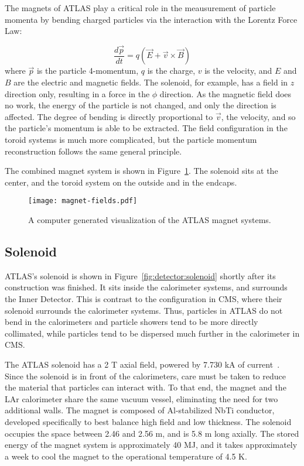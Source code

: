 The magnets of ATLAS play a critical role in the meausurement of particle momenta by bending charged particles via the interaction with the Lorentz Force Law:

\begin{equation}
\frac{d \vec{p}}{d t} = q (\vec{E} + \vec{v} \times \vec{B})
\end{equation}
%
where $\vec{p}$ is the particle 4-momentum, $q$ is the charge, $v$ is the velocity, and $E$ and $B$ are the electric and magnetic fields. The solenoid, for example, has a field in $z$ direction only, resulting in a force in the $\phi$ direction. As the magnetic field does no work, the energy of the particle is not changed, and only the direction is affected. The degree of bending is directly proportional to $\vec{v}$, the velocity, and so the particle's momentum is able to be extracted. The field configuration in the toroid systems is much more complicated, but the particle momentum reconstruction follows the same general principle. 

The combined magnet system is shown in Figure~\ref{fig:detector:magnets}. The solenoid sits at the center, and the toroid system on the outside and in the endcaps.


\begin{figure}
\centering
\texttt{[image: magnet-fields.pdf]}
\label{fig:detector:magnets}
\caption{A computer generated visualization of the ATLAS magnet systems.}
\end{figure}



\subsection{Solenoid}
\label{atlas:magnets:solenoid}

ATLAS's solenoid is shown in Figure~\ref{fig:detector:solenoid} shortly after its construction was finished. It sits inside the calorimeter systems, and surrounds the Inner Detector. This is contrast to the configuration in CMS, where their solenoid surrounds the calorimeter systems. Thus, particles in ATLAS do not bend in the calorimeters and particle showers tend to be more directly collimated, while particles tend to be dispersed much further in the calorimeter in CMS.

The ATLAS solenoid has a 2 T axial field, powered by 7.730 kA of current~\cite{ATLASPaper}. Since the solenoid is in front of the calorimeters, care must be taken to reduce the material that particles can interact with. To that end, the magnet and the LAr calorimeter share the same vacuum vessel, eliminating the need for two additional walls. The magnet is composed of Al-stabilized NbTi conductor, developed specifically to best balance high field and low thickness. The solenoid occupies the space between 2.46 and 2.56 m, and is 5.8 m long axially. The stored energy of the magnet system is approximately 40 MJ, and it takes approximately a week to cool the magnet to the operational temperature of 4.5 K. 

